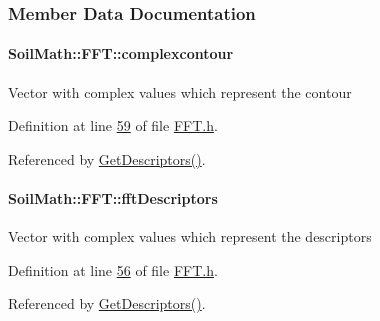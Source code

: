 \subsubsection{Member Data Documentation}
\hypertarget{class_soil_math_1_1_f_f_t_a48141f0c777ca86f2e536f88b509b639}{}
\paragraph[{complexcontour}]{ Soil\+Math\+::\+F\+F\+T\+::complexcontour\hspace{0.3cm}{\ttfamily [private]}}\label{class_soil_math_1_1_f_f_t_a48141f0c777ca86f2e536f88b509b639}
Vector with complex values which represent the contour 

Definition at line \hyperlink{_f_f_t_8h_source_l00059}{59} of file \hyperlink{_f_f_t_8h_source}{F\+F\+T.\+h}.



Referenced by \hyperlink{_f_f_t_8cpp_source_l00015}{Get\+Descriptors()}.

\hypertarget{class_soil_math_1_1_f_f_t_a466b360529319d0e6e3220f446f703be}{}
\paragraph[{fft\+Descriptors}]{ Soil\+Math\+::\+F\+F\+T\+::fft\+Descriptors\hspace{0.3cm}{\ttfamily [private]}}\label{class_soil_math_1_1_f_f_t_a466b360529319d0e6e3220f446f703be}
Vector with complex values which represent the descriptors 

Definition at line \hyperlink{_f_f_t_8h_source_l00056}{56} of file \hyperlink{_f_f_t_8h_source}{F\+F\+T.\+h}.



Referenced by \hyperlink{_f_f_t_8cpp_source_l00015}{Get\+Descriptors()}.

\hypertarget{class_soil_math_1_1_f_f_t_a2efda8f90cd255a2c18352636352044f}{}

